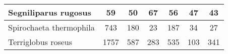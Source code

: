 \begin{minipage}{0.91\textwidth}
\begin{adjustbox}{center}
\begin{tabular}{|l||c|c|c|c|c|c|}
\hline
Segniliparus rugosus & \cellcolor[RGB]{251, 223, 223} 59 & \cellcolor[RGB]{241, 241, 253} 50 & \cellcolor[RGB]{246, 177, 177} 67 & \cellcolor[RGB]{253, 237, 237} 56 & \cellcolor[RGB]{227, 227, 252} 47 & \cellcolor[RGB]{209, 209, 250} 43 \\
\hline
Spirochaeta thermophila & \cellcolor[RGB]{235, 71, 71} 743 & \cellcolor[RGB]{252, 232, 232} 180 & \cellcolor[RGB]{232, 232, 252} 23 & \cellcolor[RGB]{252, 232, 232} 187 & \cellcolor[RGB]{232, 232, 252} 34 & \cellcolor[RGB]{232, 232, 252} 27 \\
\hline
Terriglobus roseus & \cellcolor[RGB]{235, 71, 71} 1757 & \cellcolor[RGB]{252, 227, 227} 587 & \cellcolor[RGB]{227, 227, 252} 283 & \cellcolor[RGB]{253, 237, 237} 535 & \cellcolor[RGB]{195, 195, 248} 103 & \cellcolor[RGB]{237, 237, 253} 341 \\
\hline
\end{tabular}
\end{adjustbox}
\end{minipage}
